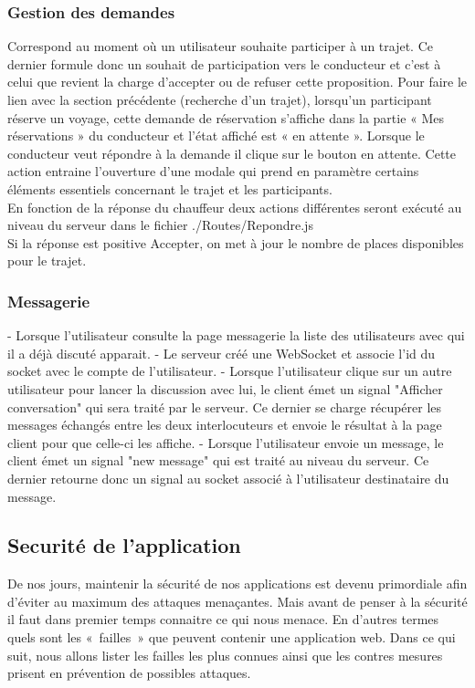 \documentclass{article}
\begin{document}
\subsubsection{Gestion des demandes} 
Correspond au moment où un utilisateur souhaite participer à un trajet. Ce dernier formule donc un souhait de participation vers le conducteur et c’est à celui que revient la charge d’accepter ou de refuser cette proposition. 
Pour faire le lien avec la section précédente (recherche d’un trajet), lorsqu’un participant  réserve un voyage, cette demande de réservation s’affiche dans la partie « Mes réservations » du conducteur et l’état affiché est « en attente ». 
Lorsque le conducteur veut répondre à la demande il clique sur le bouton en attente. Cette action entraine l’ouverture d’une modale qui prend en paramètre certains éléments essentiels concernant le trajet et les participants.	 \\
En fonction de la réponse du chauffeur deux actions différentes seront exécuté au niveau du serveur dans le fichier ./Routes/Repondre.js  \\
Si la réponse est positive  Accepter, on met à jour le nombre de places disponibles pour le trajet. 
\subsubsection{Messagerie} 
- Lorsque l'utilisateur consulte la page messagerie la liste des utilisateurs avec qui il a déjà discuté apparait.
- Le serveur créé une WebSocket et associe l'id du socket avec le compte de l'utilisateur.
- Lorsque l'utilisateur clique sur un autre utilisateur pour lancer la discussion avec lui, le client émet un signal "Afficher conversation" qui sera traité par le serveur. Ce dernier se charge récupérer les messages échangés entre les deux interlocuteurs et envoie le résultat à la page client pour que celle-ci les affiche.
- Lorsque l'utilisateur envoie un message,  le client émet un signal "new message" qui est traité au niveau du serveur. Ce dernier retourne donc un signal au socket associé à l'utilisateur destinataire du message.


\subsection{Securité de l'application}
De nos jours, maintenir la sécurité de nos applications est devenu primordiale afin d’éviter au maximum des attaques menaçantes. Mais avant de penser à la sécurité il faut dans premier temps connaitre ce qui nous menace. En d'autres termes quels sont les « failles » que peuvent contenir une application web. 
Dans ce qui suit, nous allons lister les failles les plus connues ainsi que les contres mesures prisent en prévention de possibles attaques.
\end{document}
